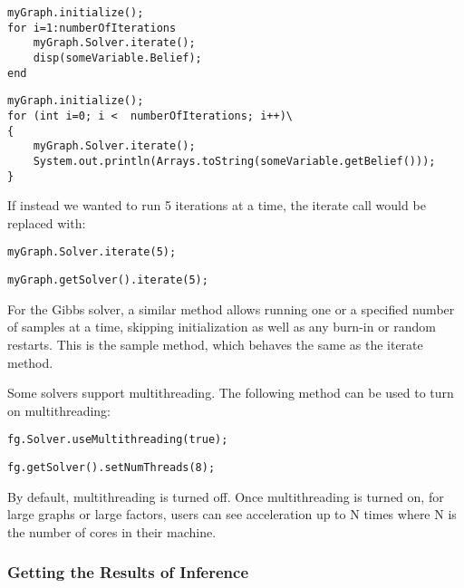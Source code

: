 \ifmatlab

\begin{lstlisting}
myGraph.initialize();
for i=1:numberOfIterations
	myGraph.Solver.iterate();
	disp(someVariable.Belief);
end
\end{lstlisting}

\fi

\ifjava

\begin{lstlisting}
myGraph.initialize();
for (int i=0; i <  numberOfIterations; i++)\
{
	myGraph.Solver.iterate();
	System.out.println(Arrays.toString(someVariable.getBelief()));
}
\end{lstlisting}

\fi

If instead we wanted to run 5 iterations at a time, the iterate call would be replaced with:

\ifmatlab

\begin{lstlisting}
myGraph.Solver.iterate(5);
\end{lstlisting}

\fi

\ifjava
\begin{lstlisting}
myGraph.getSolver().iterate(5);
\end{lstlisting}

\fi

For the Gibbs solver, a similar method allows running one or a specified number of samples at a time, skipping initialization as well as any burn-in or random restarts.  This is the sample method, which behaves the same as the iterate method.


Some solvers support multithreading.  The following method can be used to turn on multithreading:

\ifmatlab
\begin{lstlisting}
fg.Solver.useMultithreading(true);
\end{lstlisting}
\fi

\ifjava
\begin{lstlisting}
fg.getSolver().setNumThreads(8);
\end{lstlisting}
\fi

By default, multithreading is turned off.  Once multithreading is turned on, for large graphs or large factors, users can see acceleration up to N times where N is the number of cores in their machine.


\subsubsection{Getting the Results of Inference}

